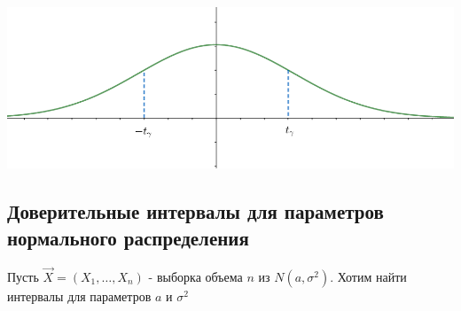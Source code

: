 \documentclass[12pt]{article}
\begin{document}

\begin{center}
    \includegraphics[width=15cm]{mathstat/images/mathstat_2025_03_11_2}
\end{center}

\subsection{Доверительные интервалы для параметров нормального распределения}

Пусть $\vec X = (X_1, \dots, X_n)$ - выборка объема $n$ из $N(a, \sigma^2)$. 
Хотим найти интервалы для параметров $a$ и $\sigma^2$
\end{document}
